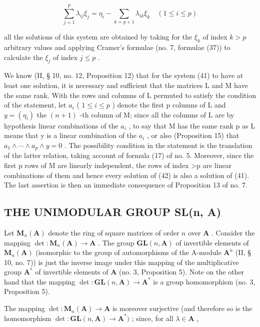 \[
\sum_ {j = 1} ^ {p} \lambda_ {i j} \xi_ {j} = \eta_ {i} - \sum_ {k = p + 1} \lambda_ {i k} \xi_ {k} \quad (1 \leqslant i \leqslant p)\tag{42}
\]

all the solutions of this system are obtained by taking for the \(\xi_{k}\) of index \(k > p\) arbitrary values and applying Cramer's formulae (no. 7, formulae (37)) to calculate the \(\xi_{j}\) of index \(j \leqslant p\) .

We know (II, § 10, no. 12, Proposition 12) that for the system (41) to have at least one solution, it is necessary and sufficient that the matrices L and M have the same rank. With the rows and columns of L permuted to satisfy the condition of the statement, let \(a_{i}\) ( \(1 \leqslant i \leqslant p\) ) denote the first p columns of L and \(y = (\eta_{i})\) the \((n + 1)\) -th column of M; since all the columns of L are by hypothesis linear combinations of the \(a_{i}\) , to say that M has the same rank p as L means that y is a linear combination of the \(a_{i}\) , or also (Proposition 15) that \(a_{1} \wedge \cdots \wedge a_{p} \wedge y = 0\) . The possibility condition in the statement is the translation of the latter relation, taking account of formula (17) of no. 5. Moreover, since the first p rows of M are linearly independent, the rows of index \textgreater p are linear combinations of them and hence every solution of (42) is also a solution of (41). The last assertion is then an immediate consequence of Proposition 13 of no. 7.

\subsection{THE UNIMODULAR GROUP SL(n, A)}

Let \(\mathbf{M}_n(\mathbf{A})\) denote the ring of square matrices of order \(n\) over \(\mathbf{A}\) . Consider the mapping \(\det: \mathbf{M}_n(\mathbf{A}) \to \mathbf{A}\) . The group \(\mathbf{GL}(n, \mathbf{A})\) of invertible elements of \(\mathbf{M}_n(\mathbf{A})\) (isomorphic to the group of automorphisms of the A-module \(\mathbf{A}^n\) (II, § 10, no. 7)) is just the inverse image under this mapping of the multiplicative group \(\mathbf{A}^*\) of invertible elements of \(\mathbf{A}\) (no. 3, Proposition 5). Note on the other hand that the mapping \(\det: \mathbf{GL}(n, \mathbf{A}) \to \mathbf{A}^*\) is a group homomorphism (no. 3, Proposition 5).

The mapping \(\operatorname{det}:\mathbf{M}_n(\mathbf{A})\to \mathbf{A}\) is moreover surjective (and therefore so is the homomorphism \(\operatorname{det}:\mathbf{GL}(n,\mathbf{A})\to \mathbf{A}^*)\) ; since, for all \(\lambda \in \mathbf{A}\) ,

